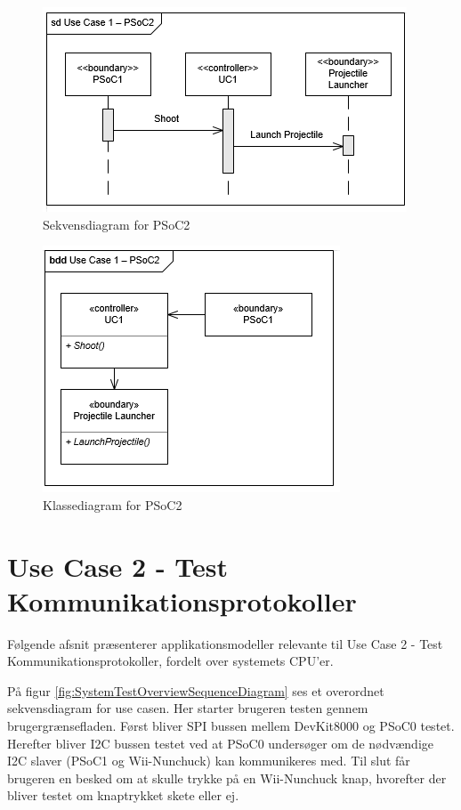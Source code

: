 \begin{figure}[H]
	\centering
	\includegraphics[scale=0.8]{Systemarkitektur/images/UC1PSoC2SequenceDiagram}
	\caption{Sekvensdiagram for PSoC2}
	\label{fig:sekvensUC1PSoC2}
\end{figure}

\begin{figure}[H]
	\centering
	\includegraphics[scale=0.8]{Systemarkitektur/images/klasseUC1PSoC2}
	\caption{Klassediagram for PSoC2}
	\label{fig:klasseUC1PSoC2}
\end{figure}

\newpage
\section{Use Case 2 - Test Kommunikationsprotokoller}

Følgende afsnit præsenterer applikationsmodeller relevante til Use Case 2 - Test Kommunikationsprotokoller, fordelt over systemets CPU'er.

På figur \ref{fig:SystemTestOverviewSequenceDiagram} ses et overordnet sekvensdiagram for use casen. Her starter brugeren testen gennem brugergrænsefladen. Først bliver SPI bussen mellem DevKit8000 og PSoC0 testet. Herefter bliver I2C bussen testet ved at PSoC0 undersøger om de nødvændige I2C slaver (PSoC1 og Wii-Nunchuck) kan kommunikeres med. Til slut får brugeren en besked om at skulle trykke på en Wii-Nunchuck knap, hvorefter der bliver testet om knaptrykket skete eller ej.

